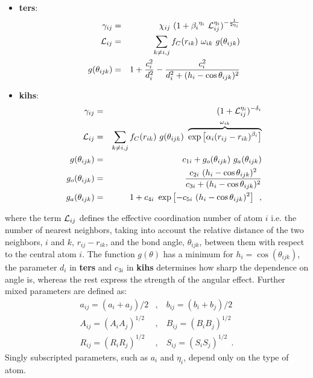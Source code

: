 \begin{itemize}
\item {\bf ters}:
\begin{eqnarray}
\gamma_{ij} &=& \chi_{ij}~(1 + {\beta_{i}}^{\eta_{i}}~{\cal{L}}_{ij}^{\eta_{i}})^{-\frac{1}{2\eta_{i}}} \nonumber \\
{\cal{L}}_{ij} &=& \sum_{k \neq i,j} f_{C}(r_{ik})~\omega_{ik}~g(\theta_{ijk}) \\
g(\theta_{ijk}) &=& 1 + \frac{c_{i}^{2}}{d_{i}^{2}} - \frac{c_{i}^{2}}{d_{i}^{2} + (h_{i} - \cos\theta_{ijk})^{2}} \nonumber
\end{eqnarray}
\item {\bf kihs}:
\begin{eqnarray}
\gamma_{ij} &=& (1 + {\cal{L}}_{ij}^{\eta_{i}})^{-\delta_{i}} \nonumber \\
{\cal{L}}_{ij} &=& \sum_{k \neq i,j} f_{C}(r_{ik})~g(\theta_{ijk})~
\overbrace{\exp \left[\alpha_{i} (r_{ij}-r_{ik})^{\beta_{i}}\right]}^{\omega_{ik}} \nonumber \\
g(\theta_{ijk}) &=& c_{1i} + {g}_{o}(\theta_{ijk})~{g}_{a}(\theta_{ijk}) \\
{g}_{o}(\theta_{ijk}) &=& \frac{c_{2i}~(h_{i} - \cos\theta_{ijk})^{2}}
{c_{3i} + (h_{i} - \cos\theta_{ijk})^{2}} \nonumber \\
{g}_{a}(\theta_{ijk}) &=& 1 + {c_{4i}~\exp \left[-c_{5i}~(h_{i} - \cos\theta_{ijk})^{2}\right]}~~, \nonumber
\end{eqnarray}
\end{itemize}
where the term ${\cal{L}}_{ij}$ defines the effective coordination
number of atom $i$ i.e. the number of nearest neighbors, taking into
account the relative distance of the two neighbors, $i$ and $k$,
$r_{ij}-r_{ik}$, and the bond angle, $\theta_{ijk}$, between them
with respect to the central atom $i$.  The function $g(\theta)$ has
a minimum for $h_{i}=\cos(\theta_{ijk})$, the parameter $d_{i}$ in
{\bf ters} and $c_{3i}$ in {\bf kihs} determines how sharp the dependence
on angle is, whereas the rest express the strength of the angular effect.
Further mixed parameters are defined as:
\begin{eqnarray}
a_{ij} = (a_{i} + a_{j})/2&,&~b_{ij} = (b_{i} + b_{j})/2 \nonumber \\
A_{ij} = (A_{i} A_{j})^{1/2}&,&~B_{ij} = (B_{i} B_{j})^{1/2} \\
R_{ij} = (R_{i} R_{j})^{1/2}&,&~S_{ij} = (S_{i} S_{j})^{1/2}~~.
\nonumber
\end{eqnarray}
Singly subscripted parameters, such as $a_{i}$ and $\eta_{i}$,
depend only on the type of atom.

